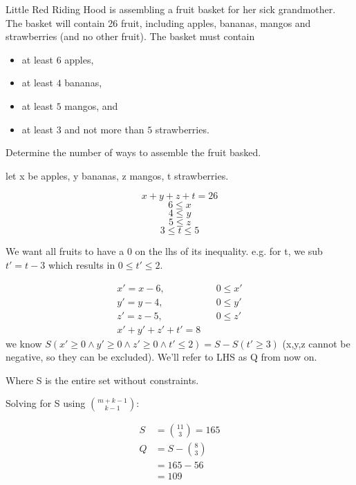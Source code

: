 
\begin{problem}
Little Red Riding Hood is assembling a fruit basket for her sick grandmother.
The basket will contain 26 fruit, including
apples, bananas, mangos and strawberries (and no other fruit). 
The basket must contain
%
\begin{itemize}
	\item at least $6$ apples, 
	\item at least $4$ bananas, 
	\item at least $5$ mangos, and
	\item at least $3$ and not more than $5$ strawberries. 
\end{itemize}
%
Determine the number of ways to assemble the fruit basked.
\end{problem}

\begin{solution}
let x be apples, y bananas, z mangos, t strawberries.

$$x+y+z+t=26$$
$$6\le x$$
$$4\le y$$
$$5\le z$$
$$3\le t \le 5$$

We want all fruits to have a 0 on the lhs of its inequality. e.g. for t,  we sub $t'=t-3$ which results in $0 \le t' \le 2$.

\begin{align*}
x' = x-6, &&  0\le x' \\
y' = y-4, &&  0\le y' \\
z' = z-5, &&  0\le z' \\
x'+y'+z'+t' = 8 
\end{align*}
we know $S(x' \ge 0 \land y' \ge 0 \land z' \ge 0 \land t' \le 2) = S - S(t' \ge 3)$ (x,y,z cannot be negative, so they can be excluded). We'll refer to LHS as Q from now on.

Where S is the entire set without constraints.

Solving for S using ${m + k - 1} \choose {k - 1}$:

\begin{align*}
S &= {11 \choose 3} = 165 \\
Q &= S - {8 \choose 3}\\
  &= 165 - 56 \\
  &= 109
\end{align*}

\end{solution}
